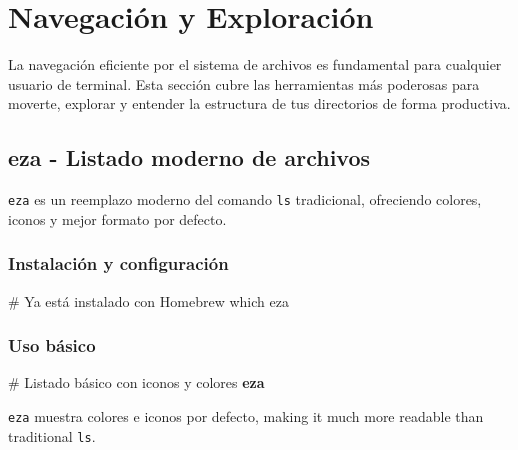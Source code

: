 \documentclass[
  11pt,
  letterpaper,
  oneside,
  openany]{scrbook}
\newenvironment{Shaded}{}{}
\newcommand{\CommentTok}[1]{\textcolor[rgb]{0.42,0.45,0.49}{#1}}
\newcommand{\ExtensionTok}[1]{\textcolor[rgb]{0.84,0.23,0.29}{\textbf{#1}}}
\newcommand{\FunctionTok}[1]{\textcolor[rgb]{0.44,0.26,0.76}{#1}}
\newcommand{\NormalTok}[1]{\textcolor[rgb]{0.14,0.16,0.18}{#1}}
\begin{document}
\chapter{Navegación y
Exploración}\label{navegaciuxf3n-y-exploraciuxf3n-2}

La navegación eficiente por el sistema de archivos es fundamental para
cualquier usuario de terminal. Esta sección cubre las herramientas más
poderosas para moverte, explorar y entender la estructura de tus
directorios de forma productiva.

\section{eza - Listado moderno de archivos}\label{sec-eza}

\texttt{eza} es un reemplazo moderno del comando \texttt{ls}
tradicional, ofreciendo colores, iconos y mejor formato por defecto.

\subsection{Instalación y
configuración}\label{instalaciuxf3n-y-configuraciuxf3n}

\begin{Shaded}
\begin{Highlighting}[]
\CommentTok{\# Ya está instalado con Homebrew}
\FunctionTok{which}\NormalTok{ eza}
\end{Highlighting}
\end{Shaded}

\subsection{Uso básico}\label{uso-buxe1sico}

\begin{Shaded}
\begin{Highlighting}[]
\CommentTok{\# Listado básico con iconos y colores}
\ExtensionTok{eza}
\end{Highlighting}
\end{Shaded}

\begin{tcolorbox}[enhanced jigsaw, toprule=.15mm, bottomrule=.15mm, opacityback=0, coltitle=black, rightrule=.15mm, colframe=quarto-callout-tip-color-frame, titlerule=0mm, opacitybacktitle=0.6, left=2mm, colback=white, bottomtitle=1mm, arc=.35mm, leftrule=.75mm, title=\textcolor{quarto-callout-tip-color}{\faLightbulb}\hspace{0.5em}{Tip}, colbacktitle=quarto-callout-tip-color!10!white, breakable, toptitle=1mm]

\texttt{eza} muestra colores e iconos por defecto, making it much more
readable than traditional \texttt{ls}.

\end{tcolorbox}
\end{document}
